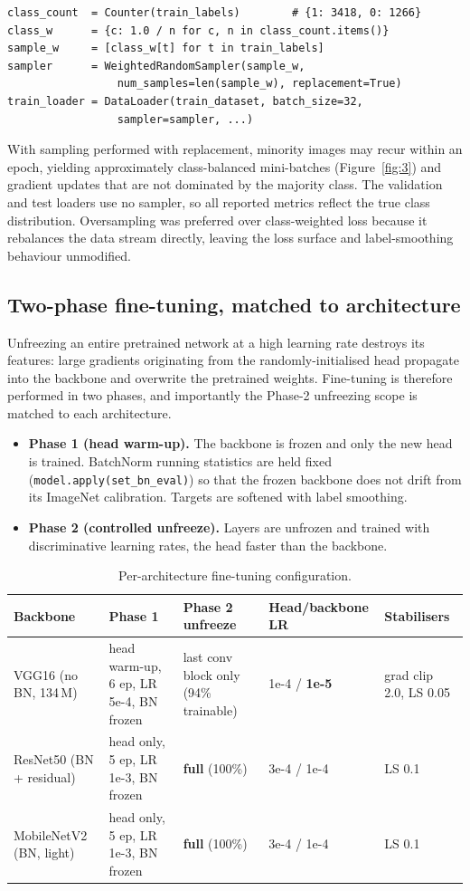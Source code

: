 \documentclass[11pt,a4paper]{article}
\numberwithin{figure}{section}
\numberwithin{table}{section}
\begin{document}
\begin{lstlisting}
class_count  = Counter(train_labels)        # {1: 3418, 0: 1266}
class_w      = {c: 1.0 / n for c, n in class_count.items()}
sample_w     = [class_w[t] for t in train_labels]
sampler      = WeightedRandomSampler(sample_w,
                 num_samples=len(sample_w), replacement=True)
train_loader = DataLoader(train_dataset, batch_size=32,
                 sampler=sampler, ...)
\end{lstlisting}

With sampling performed with replacement, minority images may recur within an epoch, yielding
approximately class-balanced mini-batches (Figure~\ref{fig:3}) and gradient updates that are not
dominated by the majority class. The validation and test loaders use no sampler, so all reported metrics
reflect the true class distribution. Oversampling was preferred over class-weighted loss because it
rebalances the data stream directly, leaving the loss surface and label-smoothing behaviour unmodified.

\subsection{Two-phase fine-tuning, matched to architecture}
\label{sec:finetune}
Unfreezing an entire pretrained network at a high learning rate destroys its features: large gradients
originating from the randomly-initialised head propagate into the backbone and overwrite the pretrained
weights. Fine-tuning is therefore performed in two phases, and importantly the Phase-2 unfreezing
scope is matched to each architecture.
\begin{itemize}
\item \textbf{Phase 1 (head warm-up).} The backbone is frozen and only the new head is trained.
BatchNorm \cite{batchnorm} running statistics are held fixed (\texttt{model.apply(set\_bn\_eval)}) so
that the frozen backbone does not drift from its ImageNet calibration. Targets are softened with label
smoothing.
\item \textbf{Phase 2 (controlled unfreeze).} Layers are unfrozen and trained with discriminative
learning rates, the head faster than the backbone.
\end{itemize}

\begin{table}[H]
\centering
\caption{Per-architecture fine-tuning configuration.}
\label{tab:ftcfg}
\small
\begin{tabularx}{\textwidth}{lXXll}
\toprule
Backbone & Phase 1 & Phase 2 unfreeze & Head/backbone LR & Stabilisers \\
\midrule
VGG16 (no BN, 134\,M) & head warm-up, 6 ep, LR 5e-4, BN frozen & last conv block only (94\% trainable) & 1e-4 / \textbf{1e-5} & grad clip 2.0, LS 0.05 \\
ResNet50 (BN + residual) & head only, 5 ep, LR 1e-3, BN frozen & \textbf{full} (100\%) & 3e-4 / 1e-4 & LS 0.1 \\
MobileNetV2 (BN, light) & head only, 5 ep, LR 1e-3, BN frozen & \textbf{full} (100\%) & 3e-4 / 1e-4 & LS 0.1 \\
\bottomrule
\end{tabularx}
\end{table}
\end{document}
